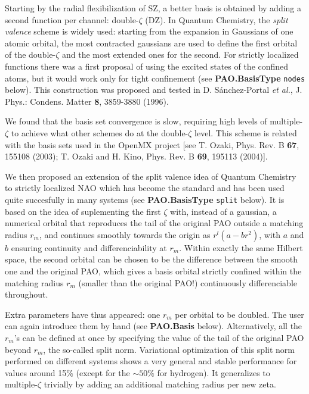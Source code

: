 \documentclass[11pt]{article}
\begin{document}
  Starting by the radial flexibilization of SZ, a better basis is obtained 
by adding a second function per channel: double-$\zeta$ (DZ).
  In Quantum Chemistry, the {\it split valence} scheme
is widely used: starting from the expansion in Gaussians of one atomic 
orbital, the most contracted gaussians are used to define the first
orbital of the double-$\zeta$ and the most extended ones for the second.
  For strictly localized functions there was a first proposal
of using the excited states of the confined atoms, but it would work only 
for tight confinement (see {\bf PAO.BasisType} {\tt nodes} below).
  This construction was proposed and tested in D. S\'anchez-Portal 
{\it et al.}, J. Phys.: Condens. Matter {\bf 8}, 3859-3880 (1996).
 
  We found that the basis set convergence is slow, requiring high levels
of multiple-$\zeta$ to achieve what other schemes do at the double-$\zeta$
level. 
  This scheme is related with the basis sets used in the OpenMX project
[see T. Ozaki, Phys. Rev. B {\bf 67}, 155108 (2003); T. Ozaki and H. Kino, 
Phys. Rev. B {\bf 69}, 195113 (2004)]. 

  We then proposed an extension of the split valence idea of Quantum Chemistry 
to strictly localized NAO which has become the standard and has been used
quite succesfully in many systems (see {\bf PAO.BasisType} {\tt split} below).
  It is based on the idea of suplementing the first $\zeta$ with, instead of
a gaussian, a numerical orbital that reproduces the tail of the original PAO 
outside a matching radius $r_{m}$, and continues smoothly towards the origin as 
$r^l(a-br^2)$, with $a$ and $b$ ensuring continuity and differenciability 
at $r_{m}$. 
  Within exactly the same
Hilbert space, the second orbital can be chosen to be the difference between
the smooth one and the original PAO, which gives a basis orbital strictly
confined within the matching radius $r_{m}$ (smaller than the
original PAO!) continuously differenciable throughout. 

  Extra parameters have thus appeared: one $r_m$ per orbital to be doubled. 
The user can again introduce them by hand (see {\bf PAO.Basis} below).
Alternatively, all the $r_m$'s can be defined at once by specifying
the value of the tail of the original PAO beyond $r_m$, the so-called
split norm. Variational optimization
of this split norm performed on different systems
shows a very general and stable performance for values around
15\% (except for the $\sim 50\%$ for hydrogen). 
  It generalizes to multiple-$\zeta$ trivially by adding an additional
matching radius per new zeta.
\end{document}
